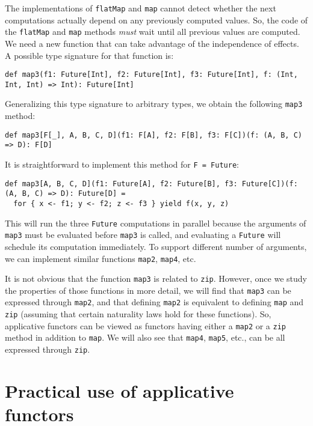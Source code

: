 \noindent The implementations of \lstinline!flatMap! and \lstinline!map!
cannot detect whether the next computations actually depend on any
previously computed values. So, the code of the \lstinline!flatMap!
and \lstinline!map! methods \emph{must} wait until all previous values
are computed. We need a new function that can take advantage of the
independence of effects. A possible type signature for that function
is:
\begin{lstlisting}
def map3(f1: Future[Int], f2: Future[Int], f3: Future[Int], f: (Int, Int, Int) => Int): Future[Int] 
\end{lstlisting}
Generalizing this type signature to arbitrary types, we obtain the
following \lstinline!map3! method:
\begin{lstlisting}
def map3[F[_], A, B, C, D](f1: F[A], f2: F[B], f3: F[C])(f: (A, B, C) => D): F[D]
\end{lstlisting}
It is straightforward to implement this method for \lstinline!F = Future!:
\begin{lstlisting}
def map3[A, B, C, D](f1: Future[A], f2: Future[B], f3: Future[C])(f: (A, B, C) => D): Future[D] =
  for { x <- f1; y <- f2; z <- f3 } yield f(x, y, z)
\end{lstlisting}
This will run the three \lstinline!Future! computations in parallel
because the arguments of \lstinline!map3! must be evaluated before
\lstinline!map3! is called, and evaluating a \lstinline!Future!
will schedule its computation immediately. To support different number
of arguments, we can implement similar functions \lstinline!map2!,
\lstinline!map4!, etc.

It is not obvious that the function \lstinline!map3! is related to
\lstinline!zip!. However, once we study the properties of those functions
in more detail, we will find that \lstinline!map3! can be expressed
through \lstinline!map2!, and that defining \lstinline!map2! is
equivalent to defining \lstinline!map! and \lstinline!zip! (assuming
that certain naturality laws hold for these functions). So, applicative
functors can be viewed as functors having either a \lstinline!map2!
or a \lstinline!zip! method in addition to \lstinline!map!. We will
also see that \lstinline!map4!, \lstinline!map5!, etc., can be all
expressed through \lstinline!zip!.

\section{Practical use of applicative functors}

